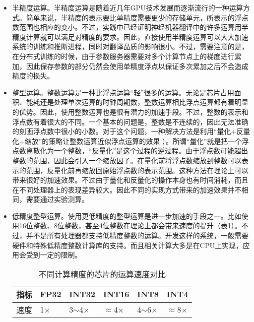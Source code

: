 \begin{itemize}
\vspace{0.5em}
\item 半精度运算。半精度运算是随着近几年GPU技术发展而逐渐流行的一种运算方式。简单来说，半精度的表示要比单精度需要更少的存储单元，所表示的浮点数范围也相应的变小。不过，实践中已经证明神经机器翻译中的许多运算用半精度计算就可以满足对精度的要求。因此，直接使用半精度运算可以大大加速系统的训练和推断进程，同时对翻译品质的影响很小。不过，需要注意的是，在分布式训练的时候，由于参数服务器需要对多个计算节点上的梯度进行累加，因此保存参数的部分仍然会使用单精度浮点以保证多次累加之后不会造成精度的损失。

\vspace{0.5em}
\item 整型运算。整数运算是一种比浮点运算``轻''很多的运算。无论是芯片占用面积、能耗还是处理单次运算的时钟周期数，整数运算相比浮点运算都有着明显的优势。因此，使用整数运算也是很有潜力的加速手段。不过，整数的表示和浮点数有着很大的不同。一个基本的问题是，整数是不连续的，因此无法准确的刻画浮点数中很小的小数。对于这个问题，一种解决方法是利用``量化+反量化+缩放''的策略让整数运算近似浮点运算的效果 \cite{DBLP:journals/corr/abs-1906-00532,DBLP:conf/cvpr/JacobKCZTHAK18,DBLP:journals/corr/abs-1910-10485}）。所谓``量化''就是把一个浮点数离散化为一个整数，``反量化''是这个过程的逆过程。由于浮点数可能超出整数的范围，因此会引入一个缩放因子。在量化前将浮点数缩放到整数可以表示的范围，反量化前再缩放回原始浮点数的表示范围。这种方法在理论上可以带来很好的加速效果。不过由于量化和反量化的操作本身也有时间消耗，而且在不同处理器上的表现差异较大。因此不同的实现方式带来的加速效果并不相同，需要通过实验测算。

\vspace{0.5em}
\item 低精度整型运算。使用更低精度的整型运算是进一步加速的手段之一。比如使用16位整数、8位整数，甚至4位整数在理论上都会带来速度的提升（表\ref{tab:7-4}）。不过，并不是所有处理器都支持低精度整数的运算。开发这样的系统，一般需要硬件和特殊低精度整数计算库的支持。而且相关计算大多是在CPU上实现，应用会受到一定的限制。

\begin{table}[htp]
\centering
\caption{不同计算精度的芯片的运算速度对比\protect\footnotemark}
\begin{tabular}{ l | l  l l l l}
\rule{0pt}{13pt} 指标 & FP32 &INT32 &INT16 &INT8 &INT4 \\ \hline
\rule{0pt}{13pt} 速度 & 1$\times$ & 3$\sim$4$\times$ & $\approx$4$\times$ & 4$\sim$6$\times$ & $\approx$8$\times$
\end{tabular}
\label{tab:7-4}
\end{table}

\vspace{0.5em}
\end{itemize}

